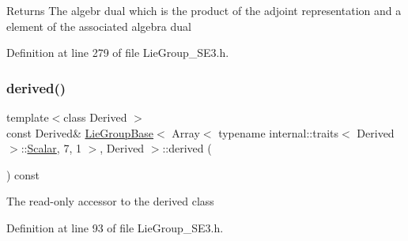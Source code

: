 \begin{DoxyReturn}{Returns}
The algebr dual which is the product of the adjoint representation and a element of the associated algebra dual 
\end{DoxyReturn}


Definition at line 279 of file Lie\+Group\+\_\+\+S\+E3.\+h.

\hypertarget{class_lie_group_base_3_01_array_3_01typename_01internal_1_1traits_3_01_derived_01_4_1_1_scalar_0d6d4b5459662fc32c7117aee50362fb1_adc2e7eb1827c5354dfa2c6abcd3f919b}{}\label{class_lie_group_base_3_01_array_3_01typename_01internal_1_1traits_3_01_derived_01_4_1_1_scalar_0d6d4b5459662fc32c7117aee50362fb1_adc2e7eb1827c5354dfa2c6abcd3f919b} 
\subsubsection{\texorpdfstring{derived()}{derived()}\hspace{0.1cm}{\footnotesize\ttfamily [1/2]}}
{\footnotesize\ttfamily template$<$class Derived $>$ \\
const Derived\& \hyperlink{class_lie_group_base}{Lie\+Group\+Base}$<$ Array$<$ typename internal\+::traits$<$ Derived $>$\+::\hyperlink{class_lie_group_base_3_01_array_3_01typename_01internal_1_1traits_3_01_derived_01_4_1_1_scalar_0d6d4b5459662fc32c7117aee50362fb1_a831695c575380c9a1df32eff9fc4a8c6}{Scalar}, 7, 1 $>$, Derived $>$\+::derived (\begin{DoxyParamCaption}{ }\end{DoxyParamCaption}) const\hspace{0.3cm}{\ttfamily [inline]}}

The read-\/only accessor to the derived class 

Definition at line 93 of file Lie\+Group\+\_\+\+S\+E3.\+h.

\hypertarget{class_lie_group_base_3_01_array_3_01typename_01internal_1_1traits_3_01_derived_01_4_1_1_scalar_0d6d4b5459662fc32c7117aee50362fb1_ad790b10c4804ee6a98cd87bdd1c8c61d}{}\label{class_lie_group_base_3_01_array_3_01typename_01internal_1_1traits_3_01_derived_01_4_1_1_scalar_0d6d4b5459662fc32c7117aee50362fb1_ad790b10c4804ee6a98cd87bdd1c8c61d} 
